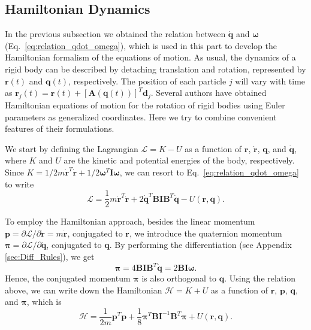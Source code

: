 \documentclass[aip,jcp,reprint,amsmath,amssymb]{revtex4-1}
\newcommand{\mt}[1]{\boldsymbol{\mathbf{#1}}}           %
\newcommand{\vt}[1]{\boldsymbol{\mathbf{#1}}}           %
\newcommand{\tr}[1]{#1^T}                               %
\begin{document}
\subsection{Hamiltonian Dynamics}
\label{sec:hamiltonian}
In the previous subsection we obtained the relation between $\dot{\boldsymbol{q}}$ and $\boldsymbol{\omega}$ (Eq.~\ref{eq:relation_qdot_omega}), which is used in this part to develop the Hamiltonian formalism of the equations of motion. As usual, the dynamics of a rigid body can be described by detaching translation and rotation, represented by ${\vt r}(t)$ and ${\vt q}(t)$, respectively. The position of each particle $j$ will vary with time as $\vt r_j(t) = \vt r(t) + \tr{[{\mt A}(\vt q(t))]}\vt d_j$. Several authors have obtained Hamiltonian equations of motion for the rotation of rigid bodies using Euler parameters as generalized coordinates.\cite{Maciejewski1985, Dichmann1996, Miller2002, Ravishankar2004, Nielsen2012} Here we try to combine convenient features of their formulations.

We start by defining the Lagrangian $\mathcal{L} = K - U$ as a function of $\vt r$, $\dot{\vt r}$, $\vt q$, and $\dot{\vt q}$, where $K$ and $U$ are the kinetic and potential energies of the body, respectively. Since $K = 1/2 m \tr{\dot{\vt r}} \dot{\vt r} + 1/2 \tr{\vt \omega} \mt I \vt \omega$,\cite{Goldstein2002} we can resort to Eq.~\ref{eq:relation_qdot_omega} to write
\[
\mathcal{L} = \frac{1}{2} m \tr{\dot{\vt r}} \dot{\vt r} + 2 \tr{\dot{\vt q}} \mt B \mt I \tr{\mt B} \dot{\vt q} - U(\vt r, \vt q).
\]

To employ the Hamiltonian approach, besides the linear momentum $\vt p = \partial \mathcal{L}/\partial \dot{\vt r} = m \dot{\vt r}$, conjugated to $\vt r$, we introduce the quaternion momentum $\vt \pi = \partial \mathcal{L}/\partial \dot{\vt q}$, conjugated to $\vt q$.\citep{Goldstein2002} By performing the differentiation (see Appendix \ref{sec:Diff_Rules}), we get
\begin{equation}
\label{eq:conj_momentum}
\vt \pi = 4 \mt B \mt I \tr{\mt B} \dot{\vt q} = 2 \mt B \mt I \vt \omega.
\end{equation}
Hence, the conjugated momentum $\vt \pi$ is also orthogonal to $\vt q$. Using the relation above, we can write down the Hamiltonian $\mathcal{H} = K + U$ as a function of $\vt r$, $\vt p$, $\vt q$, and $\vt \pi$, which is
\begin{equation}
\label{eq:H_with_B}
\mathcal{H} = \frac{1}{2m} \tr{\vt p} \vt p + \frac{1}{8} \tr{\vt \pi} {\mt B} {\mt I}^{-1} \tr{\mt B} \vt \pi + U(\vt r, \vt q).
\end{equation}
\end{document}
